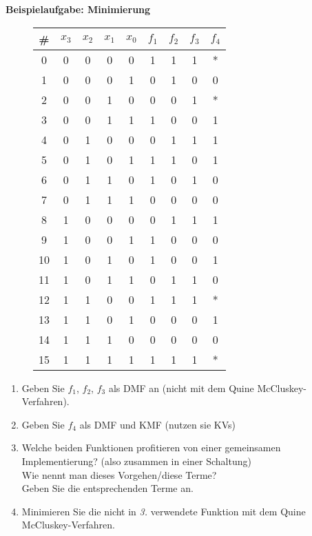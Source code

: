 \documentclass[a4paper]{scrartcl}
\begin{document}
	
	{\LARGE \textbf{Beispielaufgabe: Minimierung}}
	
	\begin{figure}[H]
		\centering
		\begin{tabular}{c|*{4}{c}*{4}{|c}}
			\# & $x_3$ & $x_2$ & $x_1$ & $x_0$ & $f_1$ & $f_2$ & $f_3$ & $f_4$ \\
			 & 0 & 0 & 0 & 0 & 1 & 1 & 1 & * \\
			 1 & 0 & 0 & 0 & 1 & 0 & 1 & 0 & 0 \\
			 2 & 0 & 0 & 1 & 0 & 0 & 0 & 1 & * \\
			 3 & 0 & 0 & 1 & 1 & 1 & 0 & 0 & 1 \\
			 4 & 0 & 1 & 0 & 0 & 0 & 1 & 1 & 1 \\
			 5 & 0 & 1 & 0 & 1 & 1 & 1 & 0 & 1 \\
			 6 & 0 & 1 & 1 & 0 & 1 & 0 & 1 & 0 \\
			 7 & 0 & 1 & 1 & 1 & 0 & 0 & 0 & 0 \\
			 8 & 1 & 0 & 0 & 0 & 0 & 1 & 1 & 1 \\
			 9 & 1 & 0 & 0 & 1 & 1 & 0 & 0 & 0 \\
			10 & 1 & 0 & 1 & 0 & 1 & 0 & 0 & 1 \\
			11 & 1 & 0 & 1 & 1 & 0 & 1 & 1 & 0 \\
			12 & 1 & 1 & 0 & 0 & 1 & 1 & 1 & * \\
			13 & 1 & 1 & 0 & 1 & 0 & 0 & 0 & 1 \\
			14 & 1 & 1 & 1 & 0 & 0 & 0 & 0 & 0 \\
			15 & 1 & 1 & 1 & 1 & 1 & 1 & 1 & *
		\end{tabular}
	\end{figure}
	
	\begin{enumerate}
		\item Geben Sie $f_1$, $f_2$, $f_3$ als DMF an (nicht mit dem Quine McCluskey-Verfahren).
		\item Geben Sie $f_4$ als DMF und KMF (nutzen sie KVs)
		\item Welche beiden Funktionen profitieren von einer gemeinsamen Implementierung? (also zusammen in einer Schaltung)  \\ 
		Wie nennt man dieses Vorgehen/diese Terme? \\
		Geben Sie die entsprechenden Terme an.
		\item Minimieren Sie die nicht in \textit{3.} verwendete Funktion mit dem Quine McCluskey-Verfahren.
		
	\end{enumerate}
\end{document}
